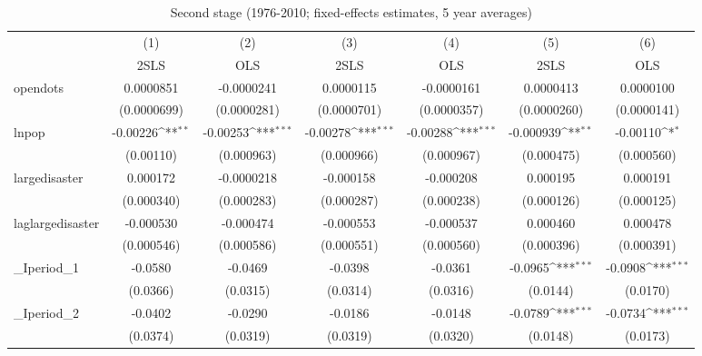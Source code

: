 \begin{table}[htbp]\centering
\def\sym#1{\ifmmode^{#1}\else\(^{#1}\)\fi}
\caption{Second stage (1976-2010; fixed-effects estimates, 5 year averages)}
\begin{tabular}{l*{6}{c}}
\hline\hline
          &\multicolumn{1}{c}{(1)}&\multicolumn{1}{c}{(2)}&\multicolumn{1}{c}{(3)}&\multicolumn{1}{c}{(4)}&\multicolumn{1}{c}{(5)}&\multicolumn{1}{c}{(6)}\\
          &\multicolumn{1}{c}{2SLS}&\multicolumn{1}{c}{OLS}&\multicolumn{1}{c}{2SLS}&\multicolumn{1}{c}{OLS}&\multicolumn{1}{c}{2SLS}&\multicolumn{1}{c}{OLS}\\
\hline
opendots  &0.0000851         &-0.0000241         &0.0000115         &-0.0000161         &0.0000413         &0.0000100         \\
          &(0.0000699)         &(0.0000281)         &(0.0000701)         &(0.0000357)         &(0.0000260)         &(0.0000141)         \\
[1em]
lnpop     & -0.00226\sym{**} & -0.00253\sym{***}& -0.00278\sym{***}& -0.00288\sym{***}&-0.000939\sym{**} & -0.00110\sym{*}  \\
          &(0.00110)         &(0.000963)         &(0.000966)         &(0.000967)         &(0.000475)         &(0.000560)         \\
[1em]
largedisaster& 0.000172         &-0.0000218         &-0.000158         &-0.000208         & 0.000195         & 0.000191         \\
          &(0.000340)         &(0.000283)         &(0.000287)         &(0.000238)         &(0.000126)         &(0.000125)         \\
[1em]
laglargedisaster&-0.000530         &-0.000474         &-0.000553         &-0.000537         & 0.000460         & 0.000478         \\
          &(0.000546)         &(0.000586)         &(0.000551)         &(0.000560)         &(0.000396)         &(0.000391)         \\
[1em]
\_Iperiod\_1&  -0.0580         &  -0.0469         &  -0.0398         &  -0.0361         &  -0.0965\sym{***}&  -0.0908\sym{***}\\
          & (0.0366)         & (0.0315)         & (0.0314)         & (0.0316)         & (0.0144)         & (0.0170)         \\
[1em]
\_Iperiod\_2&  -0.0402         &  -0.0290         &  -0.0186         &  -0.0148         &  -0.0789\sym{***}&  -0.0734\sym{***}\\
          & (0.0374)         & (0.0319)         & (0.0319)         & (0.0320)         & (0.0148)         & (0.0173)         \\

\end{tabular}
\end{table}
